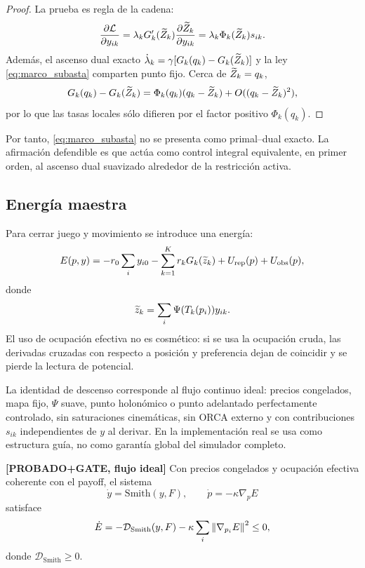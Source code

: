 \begin{proof}
La prueba es regla de la cadena:
\[
  \frac{\partial \mathcal{L}}{\partial y_{ik}}
  =
  \lambda_kG_k'(\widetilde{Z}_k)
  \frac{\partial \widetilde{Z}_k}{\partial y_{ik}}
  =
  \lambda_k\Phi_k(\widetilde{Z}_k)s_{ik}.
\]
Además, el ascenso dual exacto
$\dot\lambda_k=\gamma[G_k(q_k)-G_k(\widetilde{Z}_k)]$ y la ley
\eqref{eq:marco_subasta} comparten punto fijo. Cerca de $\widetilde{Z}_k=q_k$,
\[
  G_k(q_k)-G_k(\widetilde{Z}_k)
  =
  \Phi_k(q_k)(q_k-\widetilde{Z}_k)+O((q_k-\widetilde{Z}_k)^2),
\]
por lo que las tasas locales sólo difieren por el factor positivo $\Phi_k(q_k)$.
\end{proof}

Por tanto, \eqref{eq:marco_subasta} no se presenta como primal--dual exacto. La
afirmación defendible es que actúa como control integral equivalente, en primer orden,
al ascenso dual suavizado alrededor de la restricción activa.

\subsection{Energía maestra}

Para cerrar juego y movimiento se introduce una energía:
\begin{equation}
  E(p,y)=
  -r_0\sum_i y_{i0}
  -\sum_{k=1}^{K}r_kG_k(\widetilde{z}_k)
  +U_{\mathrm{rep}}(p)+U_{\mathrm{obs}}(p),
  \label{eq:marco_energia}
\end{equation}
donde
\[
  \widetilde{z}_k=\sum_i\Psi(T_k(p_i))y_{ik}.
\]
El uso de ocupación efectiva no es cosmético: si se usa la ocupación cruda, las derivadas
cruzadas con respecto a posición y preferencia dejan de coincidir y se pierde la lectura
de potencial.

La identidad de descenso corresponde al flujo continuo ideal: precios congelados, mapa
fijo, $\Psi$ suave, punto holonómico o punto adelantado perfectamente controlado, sin
saturaciones cinemáticas, sin ORCA externo y con contribuciones $s_{ik}$ independientes
de $y$ al derivar. En la implementación real se usa como estructura guía, no como
garantía global del simulador completo.

\begin{teorema} \textbf{[PROBADO+GATE, flujo ideal]}
Con precios congelados y ocupación efectiva coherente con el payoff, el sistema
\[
  \dot y=\mathrm{Smith}(y,F),
  \qquad
  \dot p=-\kappa\nabla_pE
\]
satisface
\[
  \dot E
  =
  -\mathcal{D}_{\mathrm{Smith}}(y,F)
  -
  \kappa\sum_i\left\|\nabla_{p_i}E\right\|^2
  \le0,
\]
donde $\mathcal{D}_{\mathrm{Smith}}\ge0$.
\end{teorema}

